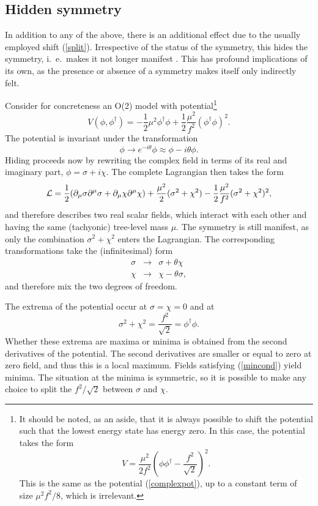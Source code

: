 \documentclass[final,twoside,12pt]{article}
\newcommand*{\La}{{\cal{L}}}
\newcommand*{\no}{\noindent}
\newcommand*{\bea}{\begin{eqnarray}}
\newcommand*{\eea}{\end{eqnarray}}
\newcommand*{\be}{\begin{equation}}
\newcommand*{\ee}{\end{equation}}
\newcommand*{\pd}{\partial}
\newcommand*{\pdm}{\pd_{\mu}}
\newcommand*{\pref}[1]{(\ref{#1})}
\newcommand*{\nn}{\nonumber}
\newcommand*{\1}{1\!\!\!\bot}
\begin{document}
\subsection{Hidden symmetry}\label{sss:hidden}

In addition to any of the above, there is an additional effect due to the usually employed shift \pref{split}. Irrespective of the status of the symmetry, this hides the symmetry, i.\ e.\ makes it not longer manifest \cite{O'Raifeartaigh:1978kv}. This has profound implications of its own, as the presence or absence of a symmetry makes itself only indirectly felt.

Consider for concreteness an O(2) model with potential\footnote{It should be noted, as an aside, that it is always possible to shift the potential such that the lowest energy state has energy zero. In this case, the potential takes the form
\be
V=\frac{\mu^2}{2f^2}\left(\phi\phi^\dagger-\frac{f^2}{\sqrt{2}}\right)^2.\label{o2model}
\ee
\no This is the same as the potential \pref{complexpot}, up to a constant term of size $\mu^2f^2/8$, which is irrelevant.}
\be
V(\phi,\phi^\dagger)=-\frac{1}{2}\mu^2\phi^\dagger\phi+\frac{1}{2}\frac{\mu^2}{f^2}(\phi^\dagger\phi)^2\label{complexpot}.
\ee
\no The potential is invariant under the transformation
\be
\phi\to e^{-i\theta}\phi\approx\phi-i\theta\phi.
\ee
\no Hiding proceeds now by rewriting the complex field in terms of its real and imaginary part, $\phi=\sigma+i\chi\nn$. The complete Lagrangian then takes the form
\be
\La=\frac{1}{2}(\pdm\sigma\pd^\mu\sigma+\pdm\chi\pd^\mu\chi)+\frac{\mu^2}{2}(\sigma^2+\chi^2)-\frac{1}{2}\frac{\mu^2}{f^2}(\sigma^2+\chi^2)^2\nn,
\ee
\no and therefore describes two real scalar fields, which interact with each other and having the same (tachyonic) tree-level mass $\mu$. The symmetry is still manifest, as only the combination $\sigma^2+\chi^2$ enters the Lagrangian. The corresponding transformations take the (infinitesimal) form
\bea
\sigma&\to&\sigma+\theta\chi\label{sxtrafo1}\\
\chi&\to&\chi-\theta\sigma\label{sxtrafo2},
\eea
\no and therefore mix the two degrees of freedom.

The extrema of the potential occur at $\sigma=\chi=0$ and at 
\be
\sigma^2+\chi^2=\frac{f^2}{\sqrt{2}}=\phi^\dagger\phi\label{mincond}.
\ee
\no Whether these extrema are maxima or minima is obtained from the second derivatives of the potential. The second derivatives are smaller or equal to zero at zero field, and thus this  is a local maximum. Fields satisfying \pref{mincond} yield minima. The situation at the minima is symmetric, so it is possible to make any choice to split the $f^2/\sqrt{2}$ between $\sigma$ and $\chi$.
\end{document}
